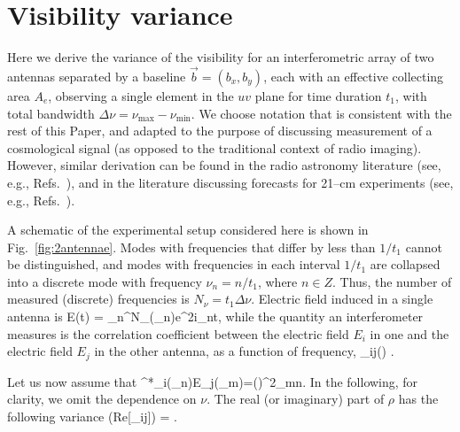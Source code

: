 \section{Visibility variance}
\label{app:Vrms}

Here we derive the variance of the visibility for an interferometric array of two antennas separated by a baseline $\vec{b}=(b_x,b_y)$, each with an effective collecting area $A_e$, observing a single element in the $uv$ plane for time duration $t_1$, with total bandwidth $\Delta \nu = \nu_\text{max}-\nu_\text{min}$. We choose notation that is consistent with the rest of this Paper, and adapted to the purpose of discussing measurement of a cosmological signal (as opposed to the traditional context of radio imaging). However, similar derivation can be found in the radio astronomy literature (see, e.g., Refs.~\cite{2001isra.book.....T,1986sicn.book.....P}), and in the literature discussing forecasts for 21--cm experiments (see, e.g., Refs.~\cite{2008PhRvD..78b3529M,2009astro2010S..82F,2014ApJ...782...66P,2007ApJ...661....1B,2008PhRvL.100i1302K,2008PhRvD..78b3529M}).

A schematic of the experimental setup considered here is shown in Fig.~\ref{fig:2antennae}. Modes with frequencies that differ by less than $1/t_1$ cannot be distinguished, and modes with frequencies in each interval $1/t_1$ are collapsed into a discrete mode with frequency $\nu_n = n/t_1$, where $n\in Z$. Thus, the number of measured (discrete) frequencies is $N_\nu=t_1\Delta \nu$. Electric field induced in a single antenna is
\beq
E(t) = \sum_{n}^{N_\nu}(\nu_n)e^{2\pi i\nu_nt},
\eeq
while the quantity an interferometer measures is the correlation coefficient between the electric field $E_i$ in one and the electric field $E_j$ in the other antenna, as a function of frequency,
\beq
\rho_{ij}(\nu) \equiv {}.
\label{eq:rho_ij}
\eeq

Let us now assume that 
\beq
\bga
\langle {}^*_i(\nu_n)\widetilde E_j(\nu_m)\rangle=\sigma(\nu)^2\delta_{mn}.
\ega
\label{eq:var_ReE}
\eeq
In the following, for clarity, we omit the dependence on $\nu$.  The real (or imaginary) part of $\rho$ has the following variance
\beq
\bga
{}(Re[\rho_{ij}]) 
 = .
\ega
\label{eq:var_Rerho}
\eeq

